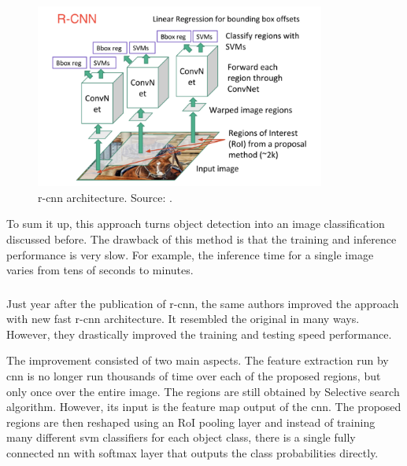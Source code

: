             \begin{figure}[ht]
                \centering
                \includegraphics[width=0.85\textwidth]{resources/r_cnn_architecture.png}
                \caption{\Gls{r-cnn} architecture. Source: \cite{xuobjectdetection}.}
                \label{fig:r-cnn architecture}
            \end{figure}
        
            To sum it up, this approach turns object detection into an image classification discussed before. The drawback of this method is that the training and inference performance is very slow. For example, the inference time for a single image varies from tens of seconds to minutes.

        \subsubsection{}
            Just year after the publication of \gls{r-cnn}, the same authors improved the approach with new \gls{fast r-cnn} \cite{girshick2015fast} architecture. It resembled the original in many ways. However, they drastically improved the training and testing speed performance.
            
            The improvement consisted of two main aspects. The feature extraction run by \gls{cnn} is no longer run thousands of time over each of the proposed regions, but only once over the entire image. The regions are still obtained by Selective search algorithm. However, its input is the feature map output of the \gls{cnn}. The proposed regions are then reshaped using an RoI pooling layer and instead of training many different \gls{svm} classifiers for each object class, there is a single fully connected \gls{nn} with softmax layer that outputs the class probabilities directly.
            
